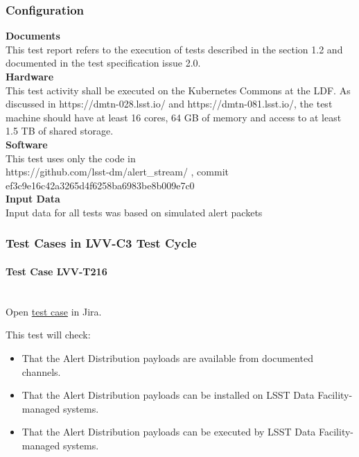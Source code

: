 \documentclass[DM,lsstdraft,STR,toc]{lsstdoc}
\providecommand{\tightlist}{
  \setlength{\itemsep}{0pt}\setlength{\parskip}{0pt}}
\begin{document}
  \subsubsection{Configuration}
    \textbf{Documents}\\[2\baselineskip]This test report refers to the
execution of tests described in the section 1.2 and documented in the
 test specification issue
2.0.\\[2\baselineskip]\textbf{Hardware}\\[2\baselineskip]This test
activity shall be executed on the Kubernetes Commons at the LDF. As
discussed in https://dmtn-028.lsst.io/ and https://dmtn-081.lsst.io/,
the test machine should have at least 16 cores, 64 GB of memory and
access to at least 1.5 TB of shared
storage.\\[2\baselineskip]\textbf{Software}\\[2\baselineskip]This test
uses only the code in\\
https://github.com/lsst-dm/alert\_stream/ , commit
ef3c9e16c42a3265d4f6258ba6983be8b009e7c0\\[2\baselineskip]\textbf{Input
Data}\\[2\baselineskip]Input data for all tests was based on simulated
alert packets\\[2\baselineskip]


  \subsubsection{Test Cases in LVV-C3 Test Cycle}


    \paragraph{Test Case LVV-T216 }\mbox{}\\

Open \href{https://jira.lsstcorp.org/secure/Tests.jspa#/testCase/LVV-T216}{test case} in Jira.

    This test will check:\\

\begin{itemize}
\tightlist
\item
  That the Alert Distribution payloads are available from documented
  channels.
\item
  That the Alert Distribution payloads can be installed on LSST Data
  Facility-managed systems.
\item
  That the Alert Distribution payloads can be executed by LSST Data
  Facility-managed systems.
\end{itemize}
\end{document}
